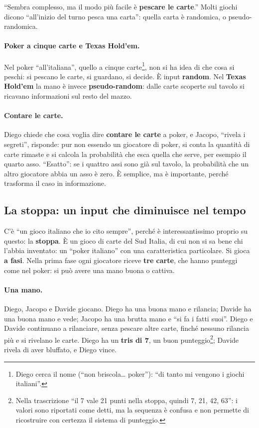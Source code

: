 ``Sembra complesso, ma il modo più facile è \textbf{pescare le carte}.'' Molti giochi dicono
``all'inizio del turno pesca una carta'': quella carta è randomica, o pseudo-randomica.

\paragraph{Poker a cinque carte e Texas Hold'em.} Nel poker ``all'italiana'', quello a
cinque carte\footnote{Diego cerca il nome (``non briscola\ldots{} poker''): ``di tanto mi
vengono i giochi italiani''.}, non si ha idea di che cosa si peschi: si pescano le carte, si
guardano, si decide. È input \textbf{random}. Nel \textbf{Texas Hold'em} la mano è invece
\textbf{pseudo-random}: dalle carte scoperte sul tavolo si ricavano informazioni sul resto
del mazzo.

\paragraph{Contare le carte.} Diego chiede che cosa voglia dire \textbf{contare le carte} a
poker, e Jacopo, ``rivela i segreti'', risponde: pur non essendo un giocatore di poker, si
conta la quantità di carte rimaste e si calcola la probabilità che esca quella che serve,
per esempio il quarto asso. ``Esatto'': se i quattro assi sono già sul tavolo, la
probabilità che un altro giocatore abbia un asso è zero. È semplice, ma è importante,
perché trasforma il caso in informazione.

\subsection{La stoppa: un input che diminuisce nel tempo}

C'è ``un gioco italiano che io cito sempre'', perché è interessantissimo proprio su questo:
la \textbf{stoppa}. È un gioco di carte del Sud Italia, di cui non si sa bene chi l'abbia
inventato: un ``poker italiano'' con una caratteristica particolare. Si gioca \textbf{a
fasi}. Nella prima fase ogni giocatore riceve \textbf{tre carte}, che hanno punteggi come nel
poker: si può avere una mano buona o cattiva.

\paragraph{Una mano.} Diego, Jacopo e Davide giocano. Diego ha una buona mano e rilancia;
Davide ha una buona mano e vede; Jacopo ha una brutta mano e ``si fa i fatti suoi''. Diego e
Davide continuano a rilanciare, senza pescare altre carte, finché nessuno rilancia più e si
rivelano le carte. Diego ha un \textbf{tris di 7}, un buon punteggio\footnote{Nella
trascrizione ``il 7 vale 21 punti nella stoppa, quindi 7, 21, 42, 63'': i valori sono
riportati come detti, ma la sequenza è confusa e non permette di ricostruire con certezza il
sistema di punteggio.}; Davide rivela di aver bluffato, e Diego vince.

